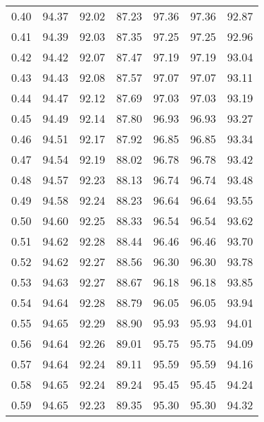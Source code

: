 \begin{tabular}{|c|c|c|c|c|c|c|}
      0.40 &     94.37 &     92.02 &      87.23 &   97.36 &      97.36 &         92.87 \\
      0.41 &     94.39 &     92.03 &      87.35 &   97.25 &      97.25 &         92.96 \\
      0.42 &     94.42 &     92.07 &      87.47 &   97.19 &      97.19 &         93.04 \\
      0.43 &     94.43 &     92.08 &      87.57 &   97.07 &      97.07 &         93.11 \\
      0.44 &     94.47 &     92.12 &      87.69 &   97.03 &      97.03 &         93.19 \\
      0.45 &     94.49 &     92.14 &      87.80 &   96.93 &      96.93 &         93.27 \\
      0.46 &     94.51 &     92.17 &      87.92 &   96.85 &      96.85 &         93.34 \\
      0.47 &     94.54 &     92.19 &      88.02 &   96.78 &      96.78 &         93.42 \\
      0.48 &     94.57 &     92.23 &      88.13 &   96.74 &      96.74 &         93.48 \\
      0.49 &     94.58 &     92.24 &      88.23 &   96.64 &      96.64 &         93.55 \\
      0.50 &     94.60 &     92.25 &      88.33 &   96.54 &      96.54 &         93.62 \\
      0.51 &     94.62 &     92.28 &      88.44 &   96.46 &      96.46 &         93.70 \\
      0.52 &     94.62 &     92.27 &      88.56 &   96.30 &      96.30 &         93.78 \\
      0.53 &     94.63 &     92.27 &      88.67 &   96.18 &      96.18 &         93.85 \\
      0.54 &     94.64 &     92.28 &      88.79 &   96.05 &      96.05 &         93.94 \\
      0.55 &     94.65 &     92.29 &      88.90 &   95.93 &      95.93 &         94.01 \\
      0.56 &     94.64 &     92.26 &      89.01 &   95.75 &      95.75 &         94.09 \\
      0.57 &     94.64 &     92.24 &      89.11 &   95.59 &      95.59 &         94.16 \\
      0.58 &     94.65 &     92.24 &      89.24 &   95.45 &      95.45 &         94.24 \\
      0.59 &     94.65 &     92.23 &      89.35 &   95.30 &      95.30 &         94.32 \\

\end{tabular}
